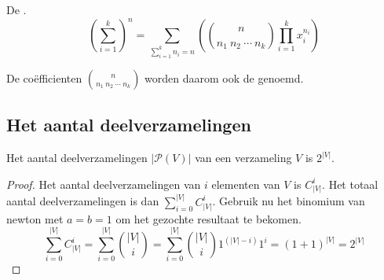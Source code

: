 \documentclass[main.tex]{subfiles}
\begin{document}
\begin{st}
  De .
  \[ \left(\sum_{i=1}^{k}\right)^{n} = \sum_{\sum_{i=1}^{k}n_{i}=n}\left(\binom{n}{n_{1}\ n_{2}\ \dotsb\ n_{k}}\prod_{i=1}^{k}x_{i}^{n_{i}}\right) \]
\end{st}

\begin{de}
  De co\"efficienten $\binom{n}{n_{1}\ n_{2}\ \dotsb\ n_{k}}$ worden daarom ook de  genoemd.
\end{de}

\subsection{Het aantal deelverzamelingen}
\label{sec:het-aant-deelv}

\begin{st}
  Het aantal deelverzamelingen $|\mathcal{P}(V)|$ van een verzameling $V$ is $2^{|V|}$.

  \begin{proof}
    Het aantal deelverzamelingen van $i$ elementen van $V$ is $C_{|V|}^{i}$.
    Het totaal aantal deelverzamelingen is dan $\sum_{i=0}^{|V|}C_{|V|}^{i}$.
    Gebruik nu het binomium van newton met $a=b=1$ om het gezochte resultaat te bekomen.
    \[ \sum_{i=0}^{|V|}C_{|V|}^{i} = \sum_{i=0}^{|V|}\binom{|V|}{i} = \sum_{i=0}^{|V|}\binom{|V|}{i}1^{(|V|-i)}1^{i} = (1+1)^{|V|} = 2^{|V|} \]
  \end{proof}
\end{st}
\end{document}
